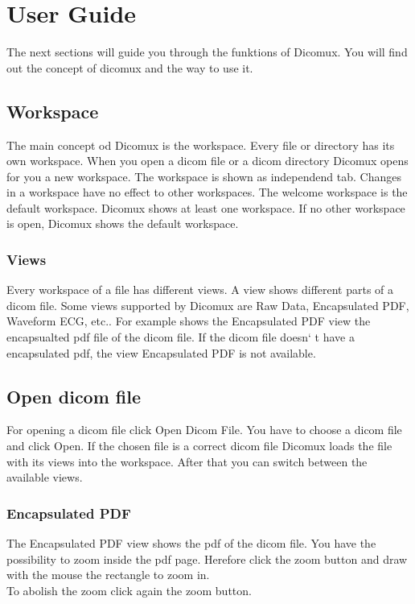%
%
\chapter{User Guide}
The next sections will guide you through the funktions of Dicomux. You will find
out the concept of dicomux and the way to use it.

\section{Workspace}
	The main concept od Dicomux is the workspace. Every file or directory has its
	own workspace. When you open a dicom file or a dicom directory Dicomux opens for
	you a new workspace. The workspace is shown as independend tab. Changes in a
	workspace have no effect to other workspaces. The welcome workspace is the
	default workspace. Dicomux shows at least one workspace. If no other workspace
	is open, Dicomux shows the default workspace.
	
	\subsection{Views}
	Every workspace of a file has different views. A view shows
	different parts of a dicom file.
	Some views supported by Dicomux are Raw Data, Encapsulated PDF, Waveform ECG,
	etc.. For example shows the Encapsulated PDF view the encapsualted pdf file of
	the dicom file. If the dicom file doesn` t have a encapsulated pdf, the view
	Encapsulated PDF is not available.

\section{Open dicom file}
For opening a dicom file click Open Dicom File. You have to choose a dicom file
and click Open. If the chosen file is a correct dicom file Dicomux loads the
file with its views into the workspace. After that you can switch between the
available views.

	\subsection{Encapsulated PDF}
	The Encapsulated PDF view shows the pdf of the dicom file. You have the
	possibility to zoom inside the pdf page. Herefore click the zoom button and draw with the
	mouse the rectangle to zoom in.\\
	To abolish the zoom click again the zoom button. 
	
